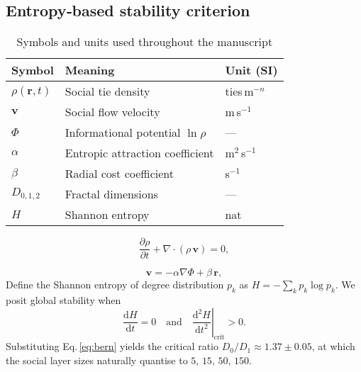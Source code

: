 \subsection{Entropy‑based stability criterion}\label{sec:entropy}
\begin{table}[h]
\caption{Symbols and units used throughout the manuscript}
\centering
\begin{tabular}{lll}
\hline
Symbol & Meaning & Unit (SI)\\\hline
$\rho(\mathbf{r},t)$ & Social tie density & ties\,m$^{-n}$\\
$\mathbf{v}$ & Social flow velocity & m\,s$^{-1}$\\
$\Phi$ & Informational potential $\ln\rho$ & —\\
$\alpha$ & Entropic attraction coefficient & m$^{2}$\,s$^{-1}$\\
$\beta$ & Radial cost coefficient & s$^{-1}$\\
$D_{0,1,2}$ & Fractal dimensions & —\\
$H$ & Shannon entropy & nat\\\hline
\end{tabular}
\label{tab:symbols}
\end{table}
\begin{equation}
\frac{\partial \rho}{\partial t} + \nabla\!\cdot\!(\rho\,\mathbf{v}) = 0 ,
\label{eq:continuity}
\end{equation}

\begin{equation}
\mathbf{v} = -\alpha \nabla \Phi + \beta\,\mathbf{r},
\label{eq:bern}
\end{equation}
Define the Shannon entropy of degree distribution $p_{k}$ as
$H = -\sum_{k} p_{k}\log p_{k}$.
We posit global stability when
\begin{equation}
\frac{\mathrm{d}H}{\mathrm{d}t}=0
\quad\text{and}\quad
\left.\frac{\mathrm{d}^{2}H}{\mathrm{d}t^{2}}\right|_{\mathrm{crit}}>0 .
\end{equation}
Substituting Eq.\,\eqref{eq:bern} yields the critical ratio
$D_{0}/D_{1} \approx 1.37 \pm 0.05$,
at which the social layer sizes naturally quantise to
$5,\,15,\,50,\,150$.

